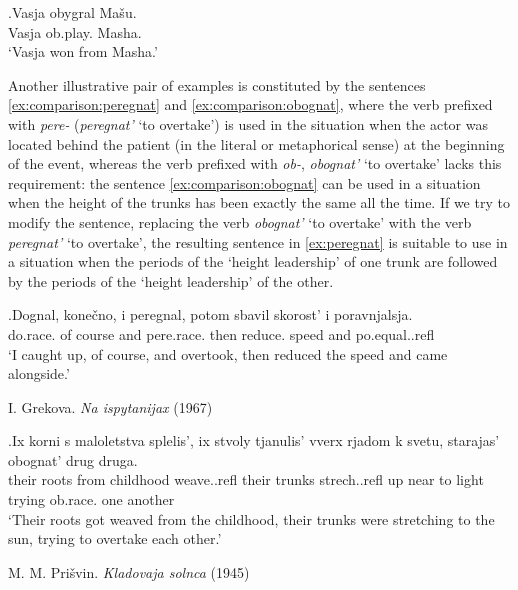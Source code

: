 \exg.\label{ex:comparison:obygrat}Vasja obygral Ma\v{s}u.\\
Vasja ob.play. Masha.\\
\vspace{0.5em}
`Vasja won from Masha.'

Another illustrative pair of examples is constituted by the sentences \ref{ex:comparison:peregnat} and \ref{ex:comparison:obognat}, where the verb prefixed with \textit{pere-} (\textit{peregnat'} `to overtake') is used in the situation when the actor was located behind the patient (in the literal or metaphorical sense) at the beginning of the event, whereas the verb prefixed with {\textit{ob-},} \textit{obognat'} `to overtake' lacks this requirement: the sentence \ref{ex:comparison:obognat} can be used in a situation when the height of the trunks has been exactly the same all the time. If we try to modify the sentence, replacing the verb \textit{obognat'} `to overtake' with the verb \textit{peregnat'} `to overtake', the resulting sentence in \ref{ex:peregnat} is suitable to use in a situation when the periods of the `height leadership' of one trunk are followed by the periods of the `height leadership' of the other.

\exg.\label{ex:comparison:peregnat}Dognal, kone\v{c}no, i peregnal, potom sbavil skorost' i poravnjalsja.\\
do.race. {of course} and pere.race. then reduce. speed and po.equal..refl\\
\vspace{0.5em}
`I caught up, of course, and overtook, then reduced the speed and came alongside.'\\
\begin{flushright}
\vspace{-1em}
I. Grekova. \textit{Na ispytanijax} (1967)
\end{flushright}

\exg.\label{ex:comparison:obognat}Ix korni s maloletstva splelis', ix stvoly tjanulis' vverx rjadom k svetu, starajas' obognat' drug druga.\\
their roots from childhood weave..refl their trunks strech..refl up near to light trying ob.race. one another\\
\vspace{0.5em}
`Their roots got weaved from the childhood, their trunks were stretching to the sun, trying to overtake each other.'
\begin{flushright}
\vspace{-0.5em}
M. M. Pri\v{s}vin. \textit{Kladovaja solnca} (1945)
\end{flushright}

